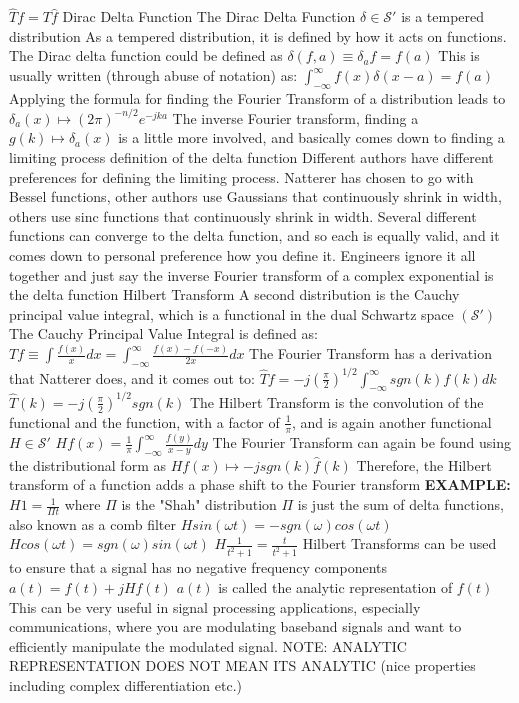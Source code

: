 \documentclass[14pt]{extarticle}
\begin{document}
\begin{outline}
					\3	$\hat{T}f = T\hat{f}$
			\1	Dirac Delta Function
				\2	The Dirac Delta Function $\delta \in \mathscr{S}'$ is a tempered distribution
				\2	As a tempered distribution, it is defined by how it acts on functions.
						The Dirac delta function could be defined as
						$\delta(f,a) \equiv \delta_af = f(a)$
				\2	This is usually written (through abuse of notation) as:
						$\int_{-\infty}^{\infty} f(x) \delta(x - a) = f(a)$
				\2	Applying the formula for finding the Fourier Transform of a distribution
						leads to $\delta_a(x) \mapsto (2\pi)^{-n/2}e^{-jka}$
				\2	The inverse Fourier transform, finding a $g(k) \mapsto \delta_a(x)$
						is a little more involved, and basically comes down to finding a
						limiting process definition of the delta function
						\3	Different authors have different preferences for defining the
								limiting process.  Natterer has chosen to go with Bessel functions,
								other authors use Gaussians that continuously shrink in width,
								others use sinc functions that continuously shrink in width.
						\3	Several different functions can converge to the delta function,
								and so each is equally valid, and it comes down to personal
								preference how you define it.  Engineers ignore it all together
								and just say the inverse Fourier transform of a complex exponential
								is the delta function
			\1	Hilbert Transform
				\2	A second distribution is the Cauchy principal value integral, which
						is a functional in the dual Schwartz space $(\mathscr{S}')$
				\2	The Cauchy Principal Value Integral is defined as:
					\3	$Tf \equiv \int \frac{f(x)}{x} dx = \int_{-\infty}^{\infty} \frac{f(x) - f(-x)}{2x}dx$
				\2	The Fourier Transform has a derivation that Natterer does, and it
						comes out to:
					\3	$\hat{T}f = -j (\frac{\pi}{2})^{1/2} \int_{-\infty}^{\infty} sgn(k) f(k) dk$
					\3	$\hat{T}(k) = -j (\frac{\pi}{2})^{1/2}sgn(k)$
				\2	The Hilbert Transform is the convolution of the functional and the
						function, with a factor of $\frac{1}{\pi}$, and is again another
						functional $H \in \mathscr{S}'$
					\3	$Hf(x) = \frac{1}{\pi}\int_{-\infty}^{\infty} \frac{f(y)}{x-y}dy$
				\2	The Fourier Transform can again be found using the distributional form as
					\3	$Hf(x) \mapsto -j sgn(k) \hat{f}(k)$
					\3	Therefore, the Hilbert transform of a function adds a phase shift
							to the Fourier transform
				\2	\textbf{EXAMPLE:}
					\3	$H 1 = \frac{1}{\Pi t}$ where $\Pi$ is the "Shah" distribution
						\4	$\Pi$ is just the sum of delta functions, also known as a comb filter
					\3	$H sin(\omega t) = -sgn(\omega) cos(\omega t)$
					\3	$H cos(\omega t) = sgn(\omega) sin(\omega t)$
					\3	$H \frac{1}{t^2 + 1} = \frac{t}{t^2 + 1}$
				\2	Hilbert Transforms can be used to ensure that a signal has no
						negative frequency components
					\3	$a(t) = f(t) + j Hf(t)$
					\3	$a(t)$ is called the analytic representation of $f(t)$
					\3	This can be very useful in signal processing applications, 
							especially communications, where you are modulating baseband
							signals and want to efficiently manipulate the modulated signal.
					\3	NOTE: ANALYTIC REPRESENTATION DOES NOT MEAN ITS ANALYTIC (nice properties
							including complex differentiation etc.)

\end{outline}
\end{document}
